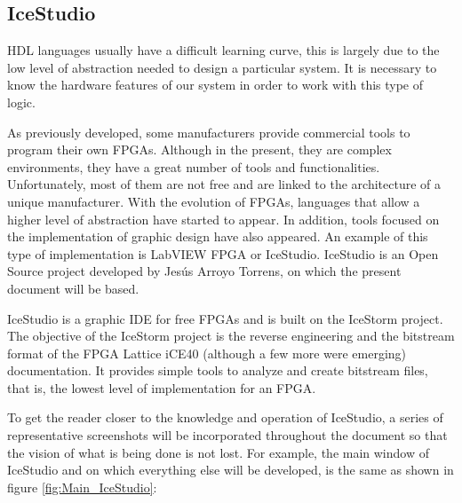 \subsection{IceStudio}\label{sec:IceStudio}
HDL languages usually have a difficult learning curve, this is largely due to the low level of abstraction needed to design a particular system. It is necessary to know the hardware features of our system in order to work with this type of logic. \newline

As previously developed, some manufacturers provide commercial tools to program their own FPGAs. Although in the present, they are complex environments, they have a great number of tools and functionalities. Unfortunately, most of them are not free and are linked to the architecture of a unique manufacturer.
\newline
With the evolution of FPGAs, languages that allow a higher level of abstraction have started to appear. In addition, tools focused on the implementation of graphic design have also appeared. An example of this type of implementation is LabVIEW FPGA or IceStudio\cite{IceStudio}. \newline
IceStudio is an Open Source project developed by Jesús Arroyo Torrens, on which the present document will be based. \newline

IceStudio is a graphic IDE for free FPGAs and is built on the IceStorm project. The objective of the IceStorm project is the reverse engineering and the bitstream format of the FPGA Lattice iCE40 (although a few more were emerging) documentation. It provides simple tools to analyze and create bitstream files, that is, the lowest level of implementation for an FPGA.\newline

To get the reader closer to the knowledge and operation of IceStudio, a series of representative screenshots will be incorporated throughout the document so that the vision of what is being done is not lost. For example, the main window of IceStudio and on which everything else will be developed, is the same as shown in figure \ref{fig:Main_IceStudio}: \newline

